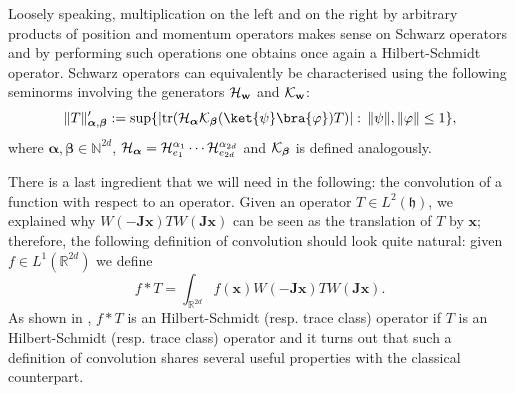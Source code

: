 \documentclass[preprint]{elsarticle}
\theoremstyle{definition}
\def\hh{\mathfrak{h} }
\def\RR{\mathbb{R}}
\def\hh{\mathfrak{h}}
\def\tr{{\rm tr}}
\begin{document}
Loosely speaking, multiplication on the left and on the right by arbitrary products of position and momentum operators makes sense on Schwarz operators and by performing such operations one obtains once again a Hilbert-Schmidt operator. Schwarz operators can equivalently be characterised using the following seminorms involving the generators ${\cal H}_\mathbf{w}$ and ${\cal K}_{\mathbf{w}}$:
$$\|T\|^\prime_{\boldsymbol{\alpha},\boldsymbol{\beta}}:=\sup\{|\tr({\cal H}_{\boldsymbol{\alpha}}{\cal K}_{\boldsymbol{\beta}}(\ket{\psi}\bra{\varphi})T)|: \, \|\psi\|, \|\varphi\| \leq 1\},$$
where $\boldsymbol{\alpha}, \boldsymbol{\beta} \in \mathbb{N}^{2d}$, ${\cal H}_{\boldsymbol{\alpha}}={\cal H}^{\alpha_1}_{e_1}\cdots {\cal H}_{e_{2d}}^{\alpha_{2d}}$ and ${\cal K}_{\boldsymbol{\beta}}$ is defined analogously.

There is a last ingredient that we will need in the following: the convolution of a function with respect to an operator. Given an operator $T \in L^2(\hh)$, we explained why $W(-\mathbf{J}\mathbf{x})TW(\mathbf{J}\mathbf{x})$ can be seen as the translation of $T$ by $\mathbf{x}$; therefore, the following definition of convolution should look quite natural: given $f \in L^1(\RR^{2d})$ we define
$$f*T=\int_{\RR^{2d}}f(\mathbf{x})W(-\mathbf{J}\mathbf{x})TW(\mathbf{J}\mathbf{x}).$$
As shown in \cite{We84}, $f*T$ is an Hilbert-Schmidt (resp. trace class) operator if $T$ is an Hilbert-Schmidt (resp. trace class) operator and it turns out that such a definition of convolution shares several useful properties with the classical counterpart. 
\end{document}
